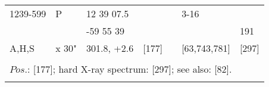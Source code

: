 \documentclass{aa}
\begin{document}
\begin{table*}[h]
\begin{tabular}{p{2.5cm}p{1cm}p{1.8cm}p{2.3cm}p{3.3cm}p{2.0cm}p{2.2cm}}
\noalign{\smallskip}
\hline
\noalign{\smallskip}
 1239-599   &   P       & 12 39 07.5        &                       &              & 3-16                           &                      \\
                     &             & -59 55 39          &                       &              &                                    &     191           \\
A,H,S          &  x 30"  & 301.8, +2.6       &   [177]           &              &  [63,743,781]       &    [297]         \\
\\
\multicolumn{7}{p{17.5cm}}{
$Pos$.: [177]; hard X-ray spectrum: [297]; see also: [82].}\\

\noalign{\smallskip}
\hline
\end{tabular}
\end{table*}
\end{document}
